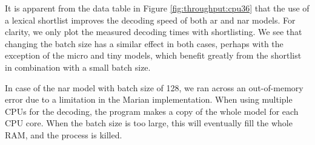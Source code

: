 It is apparent from the data table in Figure \ref{fig:throughput:cpu36} that
the use of a lexical shortlist improves the decoding speed of both \ac{ar} and
\ac{nar} models. For clarity, we only plot the measured decoding times with
shortlisting. We see that changing the batch size has a similar effect in both
cases, perhaps with the exception of the micro and tiny models, which benefit
greatly from the shortlist in combination with a small batch size.

In case of the \ac{nar} model with batch size of 128, we ran across an
out-of-memory error due to a limitation in the Marian implementation. When
using multiple CPUs for the decoding, the program makes a copy of the whole
model for each CPU core. When the batch size is too large, this will eventually
fill the whole RAM, and the process is killed.


